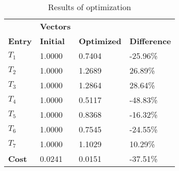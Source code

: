 \begin{table}[H]
\centering
\begin{tabular}{llll}
\textbf{}      & \cellcolor[HTML]{EFEFEF}\textbf{Vectors} & \textbf{} & \textbf{}         \\
\rowcolor[HTML]{EFEFEF} 
\textbf{Entry} & \textbf{Initial} & \textbf{Optimized} & \textbf{Difference} \\
$T_1$ & 1.0000 & 0.7404 & -25.96\% \\ 
$T_2$ & 1.0000 & 1.2689 & 26.89\% \\ 
$T_3$ & 1.0000 & 1.2864 & 28.64\% \\ 
$T_4$ & 1.0000 & 0.5117 & -48.83\% \\ 
$T_5$ & 1.0000 & 0.8368 & -16.32\% \\ 
$T_6$ & 1.0000 & 0.7545 & -24.55\% \\ 
$T_7$ & 1.0000 & 1.1029 & 10.29\% \\ 
\rowcolor[HTML]{EFEFEF} 
\textbf{Cost}  & 0.0241 & 0.0151 & -37.51\% \\ 
\end{tabular}
\caption{Results of optimization}
\label{tab:OptimizationAnalysis}
\end{table}